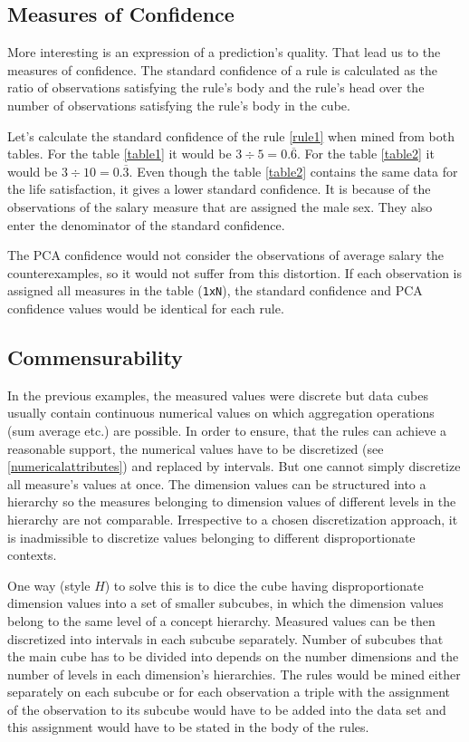 \subsection{Measures of Confidence}

More interesting is an expression of a prediction's quality. That lead us to the measures of confidence. The standard confidence of a rule is calculated as the ratio of observations satisfying the rule's body and the rule's head over the number of observations satisfying the rule's body in the cube.

Let's calculate the standard confidence of the rule \ref{rule1} when mined from both tables. For the table \ref{table1} it would be $3 \div 5 = 0.\overline{6}$. For the table \ref{table2} it would be $3 \div 10 = 0.\overline{3}$. Even though the table \ref{table2} contains the same data for the life satisfaction, it gives a lower standard confidence. It is because of the observations of the salary measure that are assigned the male sex. They also enter the denominator of the standard confidence. 

The PCA confidence would not consider the observations of average salary the counterexamples, so it would not suffer from this distortion. If each observation is assigned all measures in the table (\verb|1xN|), the standard confidence and PCA confidence values would be identical for each rule.

\subsection{Commensurability\label{commensurability}}

In the previous examples, the measured values were discrete but data cubes usually contain continuous numerical values on which aggregation operations (sum average etc.) are possible. In order to ensure, that the rules can achieve a reasonable support, the numerical values have to be discretized (see \ref{numericalattributes}) and replaced by intervals. But one cannot simply discretize all measure's values at once. The dimension values can be structured into a hierarchy so the measures belonging to dimension values of different levels in the hierarchy are not comparable.\cite{Chudan2015} Irrespective to a chosen discretization approach, it is inadmissible to discretize values belonging to different disproportionate contexts.

One way (style $H$) to solve this is to dice the cube having disproportionate dimension values into a set of smaller subcubes, in which the dimension values belong to the same level of a concept hierarchy. Measured values can be then discretized into intervals in each subcube separately. Number of subcubes that the main cube has to be divided into depends on the number dimensions and the number of levels in each dimension’s hierarchies. The rules would be mined either separately on each subcube or for each observation a triple with the assignment of the observation to its subcube would have to be added into the data set and this assignment would have to be stated in the body of the rules.

